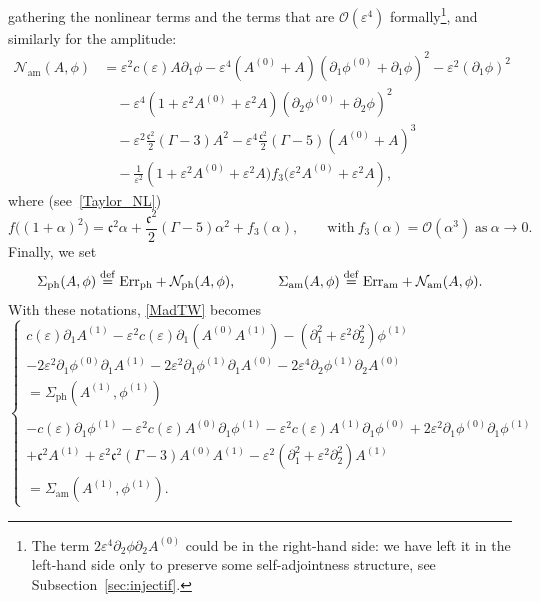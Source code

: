 \documentclass[10pt]{amsart}
\theoremstyle{definition}\newtheorem{defi}[theo]{Definition}\newtheorem{rema}[theo]{Remark}\newtheorem{exam}[theo]{Example}\newtheorem{exem}[theo]{Example}\newtheorem{nota}[theo]{Notation}
\newcommand*\p{\partial}
\newcommand*\ddef{\stackrel{\rm def}{=}}
\newcommand{\amm}{\mathrm{am}}
\newcommand{\phl}{\mathrm{ph}}
\newcommand{\Err}{\mathrm{Err}}
\newcommand*\BO{\mathcal{O}}
\newcommand*\BN{\mathcal{N}}
\newcommand*\cs{{\mathfrak c}}
\newcommand*\e{\varepsilon}
\renewcommand*\a{\alpha}
\begin{document}
gathering the nonlinear terms and the terms that are $ \BO(\e^4) $ formally\footnote{The term $ 2 \e^4 \p_2 \phi \p_2 A^{(0)} $ could be in the right-hand side: we have left it in the left-hand side only to preserve some self-adjointness structure, see Subsection~\ref{sec:injectif}.}, and similarly for the amplitude:
\begin{equation}\label{def:sourcephi}
\begin{split}
\BN_{\amm} (A, \phi)
& =\e^2 c (\e) A \p_1 \phi - \e^4 \left(A^{(0)} + A\right) \left(\p_{1} \phi^{(0)} + \p_1 \phi\right)^2 - \e^2 (\p_1 \phi)^2
\\ & \quad - \e^4 \left(1+ \e^2 A^{(0)} + \e^2 A\right) \left(\p_{2} \phi^{(0)} + \p_2 \phi\right)^2
\\ & \quad - \e^2 \frac{\cs^2}{2} (\Gamma-3) A^2 - \e^4 \frac{\cs^2}{2} (\Gamma-5) (A^{(0)} + A)^3
\\ & \quad - \frac{1}{\e^2} \left(1+ \e^2 A^{(0)} + \e^2 A) f_3(\e^2 A^{(0)} + \e^2 A\right),
\end{split}
\end{equation}
where (see~\eqref{Taylor_NL})
\[
f \big((1+ \a)^2 \big) = \cs^2 \a + \frac{\cs^2}{2} (\Gamma - 5) \a^2 + f_3(\a), \qquad \text{with} \ f_3(\a) = \BO(\a^3)
\; \text{as} \ \a \to 0.
\]
Finally, we set
\begin{align*}
\Sigma_{\phl} (A, \phi)
\ddef \Err_{\phl} + \BN_{\phl} (A, \phi),
\quad \quad \quad
\Sigma_{\amm} (A, \phi)
\ddef \Err_{\amm} + \BN_{\amm} (A, \phi).
\end{align*}
With these notations, \eqref{MadTW} becomes
\begin{equation}\label{MadTW_1}
\left\{
\begin{array}{ll}
c(\e) \p_{1} A^{(1)} - \e^2 c(\e) \p_1 \left(A^{(0)} A^{(1)}\right) - \left(\p_{1}^2 + \e^2 \p^2_{2}\right) \phi^{(1)}
\\[0.2em]
- 2 \e^2 \p_{1} \phi^{(0)} \p_{1} A^{(1)} - 2 \e^2 \p_{1} \phi^{(1)} \p_{1} A^{(0)} - 2 \e^4 \p_{2} \phi^{(1)} \p_{2} A^{(0)}
\\
= \Sigma_{\phl} \left(A^{(1)}, \phi^{(1)}\right)
\\ \ \\
- c(\e) \p_{1} \phi^{(1)} - \e^2 c(\e) A^{(0)} \p_{1} \phi^{(1)} - \e^2 c(\e) A^{(1)} \p_{1} \phi^{(0)} + 2 \e^2 \p_{1} \phi^{(0)} \p_{1} \phi^{(1)}
\\
+ \cs^2 A^{(1)} + \e^2 \cs^2 (\Gamma- 3) A^{(0)} A^{(1)} - \e^2 \left(\p_{1}^2 + \e^2 \p_{2}^2\right) A^{(1)}
\\ = \Sigma_{\amm} (A^{(1)}, \phi^{(1)}).
\end{array}\right.
\end{equation}
\end{document}
